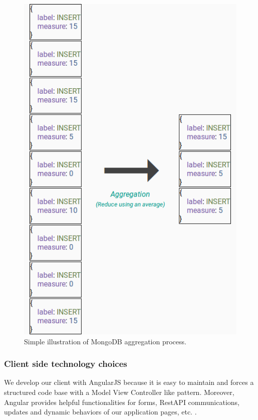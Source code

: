 \documentclass[a4paper,11pt]{report}
\begin{document}
\begin{figure}[ht]
\begin{center}
\includegraphics[scale=0.4]{images/mongodb-agg.png}
\caption{Simple illustration of MongoDB aggregation process.}
\label{mongo_agg}
\end{center}
\end{figure}

\subsubsection{Client side technology choices}

We develop our client with AngularJS because it is easy to maintain and forces a structured code base with a Model View Controller like pattern. Moreover, Angular provides helpful functionalities for forms, RestAPI communications, updates and dynamic behaviors of our application pages, etc. \cite{angular:website}.
\end{document}
